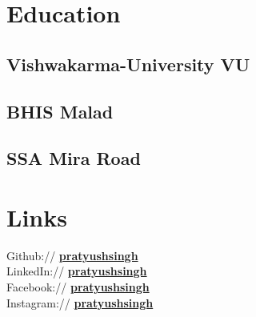 \documentclass[]{deedy-resume-openfont}
\begin{document}
%
%

%
%


%
%

\begin{minipage}[t]{0.33\textwidth} 


\section{Education} 

\subsection{Vishwakarma-University VU}
\sectionsep

\subsection{BHIS Malad}
\sectionsep

\subsection{SSA Mira Road}
\sectionsep


\section{Links} 

Github:// \href{https://github.com/PratyushSingh1}{\bf pratyushsingh} \\
LinkedIn://  \href{https://www.linkedin.com/in/pratyush-singh-dataanalyst/}{\bf pratyushsingh} \\
Facebook:// \href{https://www.facebook.com/pratyush.singh.5872?mibextid=LQQJ4d}{\bf pratyushsingh} \\
Instagram:// \href{https://instagram.com/pratshhh?igshid=OGQ5ZDc2ODk2ZA==}{\bf pratyushsingh}
\sectionsep


\end{minipage}
\end{document}
